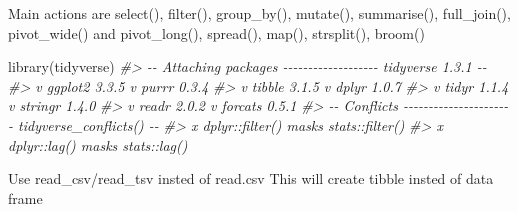 \documentclass[
]{article}
\newenvironment{Shaded}{\begin{snugshade}}{\end{snugshade}}
\newcommand{\CommentTok}[1]{\textcolor[rgb]{0.56,0.35,0.01}{\textit{#1}}}
\newcommand{\FunctionTok}[1]{\textcolor[rgb]{0.00,0.00,0.00}{#1}}
\newcommand{\NormalTok}[1]{#1}
\begin{document}
Main actions are select(), filter(), group\_by(), mutate(), summarise(),
full\_join(), pivot\_wide() and pivot\_long(), spread(), map(), strsplit(), broom()

\begin{Shaded}
\begin{Highlighting}[]
\FunctionTok{library}\NormalTok{(tidyverse)}
\CommentTok{\#\textgreater{} {-}{-} Attaching packages {-}{-}{-}{-}{-}{-}{-}{-}{-}{-}{-}{-}{-}{-}{-}{-}{-}{-}{-} tidyverse 1.3.1 {-}{-}}
\CommentTok{\#\textgreater{} v ggplot2 3.3.5     v purrr   0.3.4}
\CommentTok{\#\textgreater{} v tibble  3.1.5     v dplyr   1.0.7}
\CommentTok{\#\textgreater{} v tidyr   1.1.4     v stringr 1.4.0}
\CommentTok{\#\textgreater{} v readr   2.0.2     v forcats 0.5.1}
\CommentTok{\#\textgreater{} {-}{-} Conflicts {-}{-}{-}{-}{-}{-}{-}{-}{-}{-}{-}{-}{-}{-}{-}{-}{-}{-}{-}{-}{-}{-} tidyverse\_conflicts() {-}{-}}
\CommentTok{\#\textgreater{} x dplyr::filter() masks stats::filter()}
\CommentTok{\#\textgreater{} x dplyr::lag()    masks stats::lag()}
\end{Highlighting}
\end{Shaded}

Use read\_csv/read\_tsv insted of read.csv
This will create tibble insted of data frame
\end{document}
